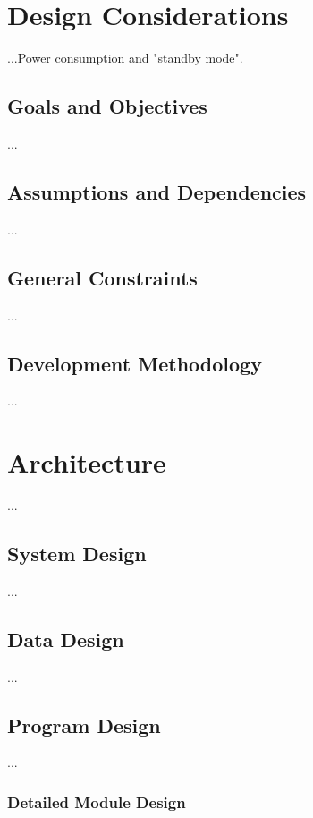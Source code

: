 \documentclass[11pt,a4paper,titlepage]{report}
\begin{document}
\section{Design Considerations}

...Power consumption and "standby mode".

\subsection{Goals and Objectives}

...

\subsection{Assumptions and Dependencies}

...

\subsection{General Constraints}

...

\subsection{Development Methodology}

...

\section{Architecture}

...

\subsection{System Design}

...

\subsection{Data Design}

...

\subsection{Program Design}

...

\subsubsection{Detailed Module Design}
\end{document}
